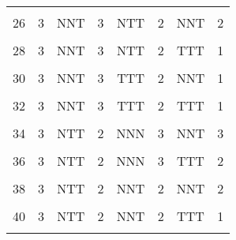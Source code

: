 \begin{table}[H]
{\begin{tabular}[t]{cccccccc}
			\cellcolor{gray!6}{25} & \cellcolor{gray!6}{3} & \cellcolor{gray!6}{NNT} & \cellcolor{gray!6}{3} & \cellcolor{gray!6}{NTT} & \cellcolor{gray!6}{2} & \cellcolor{gray!6}{NNN} & \cellcolor{gray!6}{3}\\
			26 & 3 & NNT & 3 & NTT & 2 & NNT & 2\\
			\cellcolor{gray!6}{27} & \cellcolor{gray!6}{3} & \cellcolor{gray!6}{NNT} & \cellcolor{gray!6}{3} & \cellcolor{gray!6}{NTT} & \cellcolor{gray!6}{2} & \cellcolor{gray!6}{NTT} & \cellcolor{gray!6}{1}\\
			28 & 3 & NNT & 3 & NTT & 2 & TTT & 1\\
			\cellcolor{gray!6}{29} & \cellcolor{gray!6}{3} & \cellcolor{gray!6}{NNT} & \cellcolor{gray!6}{3} & \cellcolor{gray!6}{TTT} & \cellcolor{gray!6}{2} & \cellcolor{gray!6}{NNN} & \cellcolor{gray!6}{2}\\
			30 & 3 & NNT & 3 & TTT & 2 & NNT & 1\\
			\cellcolor{gray!6}{31} & \cellcolor{gray!6}{3} & \cellcolor{gray!6}{NNT} & \cellcolor{gray!6}{3} & \cellcolor{gray!6}{TTT} & \cellcolor{gray!6}{2} & \cellcolor{gray!6}{NTT} & \cellcolor{gray!6}{1}\\
			32 & 3 & NNT & 3 & TTT & 2 & TTT & 1\\
			\cellcolor{gray!6}{33} & \cellcolor{gray!6}{3} & \cellcolor{gray!6}{NTT} & \cellcolor{gray!6}{2} & \cellcolor{gray!6}{NNN} & \cellcolor{gray!6}{3} & \cellcolor{gray!6}{NNN} & \cellcolor{gray!6}{3}\\
			34 & 3 & NTT & 2 & NNN & 3 & NNT & 3\\
			\cellcolor{gray!6}{35} & \cellcolor{gray!6}{3} & \cellcolor{gray!6}{NTT} & \cellcolor{gray!6}{2} & \cellcolor{gray!6}{NNN} & \cellcolor{gray!6}{3} & \cellcolor{gray!6}{NTT} & \cellcolor{gray!6}{2}\\
			36 & 3 & NTT & 2 & NNN & 3 & TTT & 2\\
			\cellcolor{gray!6}{37} & \cellcolor{gray!6}{3} & \cellcolor{gray!6}{NTT} & \cellcolor{gray!6}{2} & \cellcolor{gray!6}{NNT} & \cellcolor{gray!6}{2} & \cellcolor{gray!6}{NNN} & \cellcolor{gray!6}{2}\\
			38 & 3 & NTT & 2 & NNT & 2 & NNT & 2\\
			\cellcolor{gray!6}{39} & \cellcolor{gray!6}{3} & \cellcolor{gray!6}{NTT} & \cellcolor{gray!6}{2} & \cellcolor{gray!6}{NNT} & \cellcolor{gray!6}{2} & \cellcolor{gray!6}{NTT} & \cellcolor{gray!6}{1}\\
			40 & 3 & NTT & 2 & NNT & 2 & TTT & 1\\
			\cellcolor{gray!6}{41} & \cellcolor{gray!6}{3} & \cellcolor{gray!6}{NTT} & \cellcolor{gray!6}{2} & \cellcolor{gray!6}{NTT} & \cellcolor{gray!6}{1} & \cellcolor{gray!6}{NNN} & \cellcolor{gray!6}{2}\\

\end{tabular}}
\end{table}
